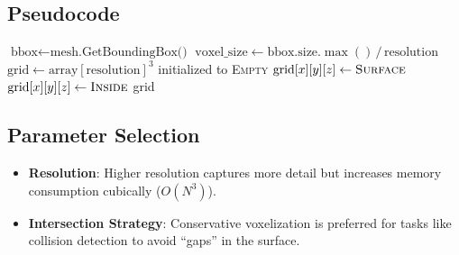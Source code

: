 \subsection{Pseudocode}
\begin{algorithm}
\caption{Voxelize Mesh}
\label{alg:voxelize_mesh}
\begin{algorithmic}[1]
    \State $\text{bbox} \gets \text{mesh.GetBoundingBox()}$
    \State $\text{voxel\_size} \gets \text{bbox.size}.\max() \,/\, \text{resolution}$
    \State $\text{grid} \gets \text{array}[\text{resolution}]^3$ initialized to \textsc{Empty}
        \State {}
        \State {}
                    \State {}
                        \State $\text{grid}[x][y][z] \gets \textsc{Surface}$
                    \EndIf
                \EndFor
            \EndFor
        \EndFor
    \EndFor
    \State {}
            \State $\text{grid}[x][y][z] \gets \textsc{Inside}$
        \EndIf
    \EndFor
    \State \Return grid
\EndFunction
\end{algorithmic}
\end{algorithm}

\subsection{Parameter Selection}
\begin{itemize}
\item \textbf{Resolution}: Higher resolution captures more detail but increases memory consumption cubically ($O(N^3)$).
\item \textbf{Intersection Strategy}: Conservative voxelization is preferred for tasks like collision detection to avoid ``gaps'' in the surface.
\end{itemize}

